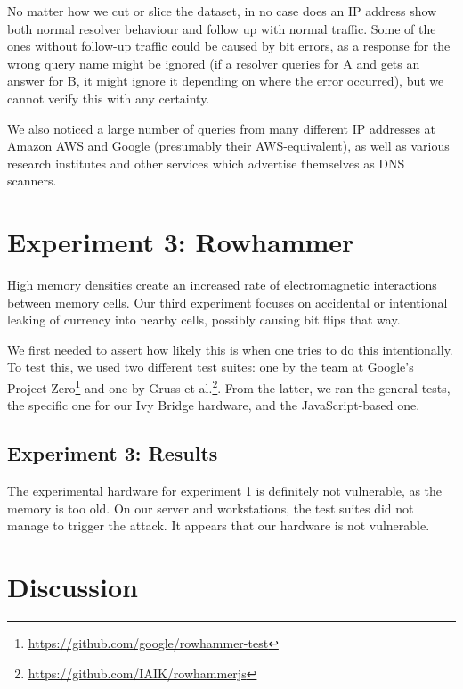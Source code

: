 \documentclass[conference]{IEEEtran}
\begin{document}
No matter how we cut or slice the dataset, in no case does an IP address show
both normal resolver behaviour and follow up with normal traffic. Some of the
ones without follow-up traffic could be caused by bit errors, as a response for
the wrong query name might be ignored (if a resolver queries for A and gets an
answer for B, it might ignore it depending on where the error occurred), but
we cannot verify this with any certainty.

We also noticed a large number of queries from many different IP addresses at
Amazon AWS and Google (presumably their AWS-equivalent), as well as various
research institutes and other services which advertise themselves as DNS
scanners.



\section{Experiment 3: Rowhammer}

High memory densities create an increased rate of electromagnetic interactions
between memory cells\cite{kim2014flipping}. Our third experiment focuses on
accidental or intentional leaking of currency into nearby cells, possibly
causing bit flips that way.

We first needed to assert how likely this is when one tries to do this
intentionally. To test this, we used two different test suites: one by the team
at Google's Project
Zero\footnote{\url{https://github.com/google/rowhammer-test}} and one by Gruss
et
al.\cite{gruss2016rowhammer}\footnote{\url{https://github.com/IAIK/rowhammerjs}}.
From the latter, we ran the general tests, the specific one for our Ivy Bridge
hardware, and the JavaScript-based one.


\subsection{Experiment 3: Results}

The experimental hardware for experiment 1 is definitely not vulnerable, as the
memory is too old. On our server and workstations, the test suites did not
manage to trigger the attack. It appears that our hardware is not vulnerable.



\section{Discussion}\label{sec:disc}
\end{document}
